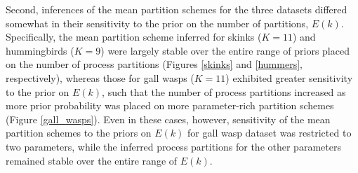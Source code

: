 \documentclass[11pt]{article}
\begin{document}
Second, inferences of the mean partition schemes for the three datasets differed somewhat in their sensitivity to the prior on the number of partitions, $E(k)$.  
Specifically, the mean partition scheme inferred for skinks ($K = 11$) and hummingbirds ($K = 9$) were largely stable over the entire range of priors 
placed on the number of process partitions (Figures \ref{skinks} and \ref{hummers}, respectively), whereas those for gall wasps ($K = 11$) exhibited greater sensitivity to the prior on $E(k)$, such that the number of process partitions increased as more prior probability was placed on more parameter-rich partition schemes (Figure \ref{gall_wasps}).  
Even in these cases, however, sensitivity of the mean partition schemes to the priors on $E(k)$ for gall wasp dataset was restricted to two parameters, while the inferred process partitions for the other parameters remained stable over the entire range of $E(k)$.
\end{document}
